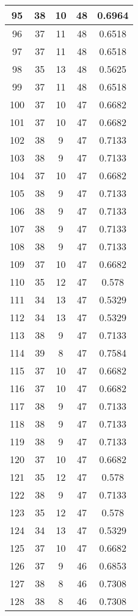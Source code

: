 \documentclass[letterpaper, 12pt]{article}
\begin{document}
\begin{longtable}{|c|c|c|c|c|}
\hline
95 & 38 & 10 & 48 & 0.6964 \\
\hline
96 & 37 & 11 & 48 & 0.6518 \\
\hline
97 & 37 & 11 & 48 & 0.6518 \\
\hline
98 & 35 & 13 & 48 & 0.5625 \\
\hline
99 & 37 & 11 & 48 & 0.6518 \\
\hline
100 & 37 & 10 & 47 & 0.6682 \\
\hline
101 & 37 & 10 & 47 & 0.6682 \\
\hline
102 & 38 & 9 & 47 & 0.7133 \\
\hline
103 & 38 & 9 & 47 & 0.7133 \\
\hline
104 & 37 & 10 & 47 & 0.6682 \\
\hline
105 & 38 & 9 & 47 & 0.7133 \\
\hline
106 & 38 & 9 & 47 & 0.7133 \\
\hline
107 & 38 & 9 & 47 & 0.7133 \\
\hline
108 & 38 & 9 & 47 & 0.7133 \\
\hline
109 & 37 & 10 & 47 & 0.6682 \\
\hline
110 & 35 & 12 & 47 & 0.578 \\
\hline
111 & 34 & 13 & 47 & 0.5329 \\
\hline
112 & 34 & 13 & 47 & 0.5329 \\
\hline
113 & 38 & 9 & 47 & 0.7133 \\
\hline
114 & 39 & 8 & 47 & 0.7584 \\
\hline
115 & 37 & 10 & 47 & 0.6682 \\
\hline
116 & 37 & 10 & 47 & 0.6682 \\
\hline
117 & 38 & 9 & 47 & 0.7133 \\
\hline
118 & 38 & 9 & 47 & 0.7133 \\
\hline
119 & 38 & 9 & 47 & 0.7133 \\
\hline
120 & 37 & 10 & 47 & 0.6682 \\
\hline
121 & 35 & 12 & 47 & 0.578 \\
\hline
122 & 38 & 9 & 47 & 0.7133 \\
\hline
123 & 35 & 12 & 47 & 0.578 \\
\hline
124 & 34 & 13 & 47 & 0.5329 \\
\hline
125 & 37 & 10 & 47 & 0.6682 \\
\hline
126 & 37 & 9 & 46 & 0.6853 \\
\hline
127 & 38 & 8 & 46 & 0.7308 \\
\hline
128 & 38 & 8 & 46 & 0.7308 \\

\end{longtable}
\end{document}
